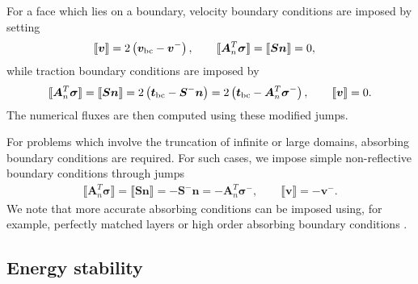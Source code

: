 \documentclass{siamart0216}
\newcommand{\LRp}[1]{\left( #1 \right)}
\newcommand{\jump}[1] {\ensuremath{\llbracket#1\rrbracket}}
\begin{document}
For a face which lies on a boundary, velocity boundary conditions are imposed by setting 
\begin{align*}
\jump{\bm{v}} &= 2\LRp{\bm{v}_{\rm bc} - \bm{v}^- }, \qquad \jump{\bm{A}_n^T\bm{\sigma}}=\jump{\bm{S}\bm{n}} = 0, 
\end{align*}
while traction boundary conditions are imposed by
\begin{align*}
\jump{\bm{A}_n^T\bm{\sigma}} = \jump{\bm{S}\bm{n}} = 2\LRp{\bm{t}_{\rm bc} - \bm{S}^-\bm{n} }= 2\LRp{\bm{t}_{\rm bc} - \bm{A}_n^T\bm{\sigma}^- }, \qquad \jump{\bm{v}} = 0.
\end{align*}
The numerical fluxes are then computed using these modified jumps.  

For problems which involve the truncation of infinite or large domains, absorbing boundary conditions are required.  For such cases, we impose simple non-reflective boundary conditions \cite{leveque2002finite} through jumps 
\begin{align*}
\jump{\bm{A}_n^T\bm{\sigma}} = \jump{\bm{S}\bm{n}} = - \bm{S}^-\bm{n} = -\bm{A}_n^T\bm{\sigma}^- , \qquad \jump{\bm{v}} = - \bm{v}^-. 
\end{align*}
We note that more accurate absorbing conditions can be imposed using, for example, perfectly matched layers \cite{berenger1994perfectly} or high order absorbing boundary conditions \cite{hagstrom2004new,modave2016high}.  



\subsection{Energy stability}
\end{document}
